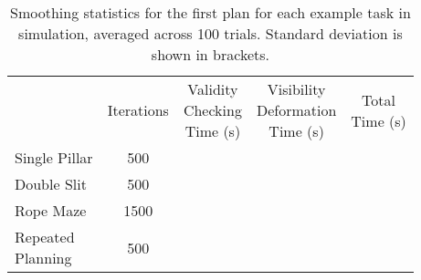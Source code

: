 \begin{table}[ht]
\centering
\caption{Smoothing statistics for the first plan for each example task in simulation, averaged across 100 trials. Standard deviation is shown in brackets.}
\label{tab:smoothing_statistics}
\begin{tabular}{lcccc}
\hline
    & Iterations & \parbox{0.7in}{\centering Validity\\Checking\\Time (s)} & \parbox{0.9in}{\centering Visibility\\Deformation\\Time (s)}& \parbox{0.5in}{\centering \smallskip Total\\Time (s) \smallskip} \\
\noalign{\smallskip}\hline\noalign{\smallskip}
Single Pillar                       &  500 & \parbox{0.5in}{} & \parbox{0.4in}{}       & \parbox{0.3in}{\smallskip{}\smallskip} \\

Double Slit                         &  500 & \parbox{0.5in}{} & \parbox{0.4in}{} & \parbox{0.3in}{\smallskip{}\smallskip} \\

Rope Maze                           & 1500 & \parbox{0.5in}{} & \parbox{0.4in}{} & \parbox{0.3in}{\smallskip{}\smallskip} \\

\parbox{0.6in}{Repeated\\Planning} &  500 & \parbox{0.5in}{} & \parbox{0.4in}{} & \parbox{0.3in}{\smallskip{}\smallskip} \\
\hline
\end{tabular}
\end{table}


